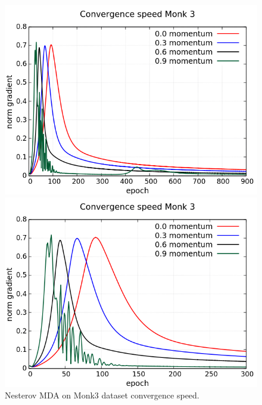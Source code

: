 \begin{figure}[H]
	\centering
	\begin{minipage}[t]{0.5\linewidth}
		\includegraphics[width=\linewidth]{data/MGD/Monk3/NM/Monk3_NMGD_CS_standard.png}
	\end{minipage}%
	\begin{minipage}[t]{0.5\linewidth}
		\includegraphics[width=\linewidth]{data/MGD/Monk3/NM/Monk3_NMGD_CS_zoom.png}
	\end{minipage}
	\caption{Nesterov MDA on Monk3 dataset convergence speed.}
\end{figure}
